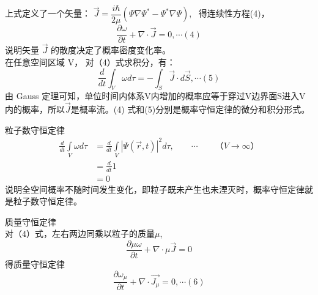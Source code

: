 \begin{frame} 
    上式定义了一个矢量： $\vec{J}=\dfrac{i \hbar}{2 \mu} \left(\Psi \nabla \Psi^{*}-\Psi^{*} \nabla \Psi\right) $,  得连续性方程(4)，\\
    \begin{equation*}
        \frac{\partial \omega}{\partial t}+ \nabla \cdot \vec{J}=0, \cdots (4)
    \end{equation*}    
    说明矢量 $\vec{J}$ 的散度决定了概率密度变化率。\\ \vspace{0.6em}
    在任意空间区域 V， 对（4）式求积分，有：
    \begin{equation*}
        \frac{d}{d t} \int_{V} \omega d \tau =-\int_{S} \vec{J} \cdot d \vec{S}, \cdots (5)
    \end{equation*}
    由 Gauss 定理可知，单位时间内体系V内增加的概率应等于穿过V边界面S进入V内的概率，所以$\vec{J}$是概率流。(4) 式和(5)分别是概率守恒定律的微分和积分形式。\\ \vspace{0.3em}
\end{frame}

\begin{frame}    
    \bullet 粒子数守恒定律\\ \vspace{0.3em}
    \begin{equation*}
        \begin{split}
        \frac{d}{d t} \int\limits_{V} \omega d \tau &= \frac{d}{d t} \int\limits_{V} |\Psi(\vec{r}, t)|^{2} d \tau ,\qquad \cdots \qquad （V \to \infty）  \\
        &=\frac{d}{d t} 1\\ 
        &=0
        \end{split}
    \end{equation*}
    说明全空间概率不随时间发生变化，即粒子既未产生也未湮灭时，概率守恒定律就是粒子数守恒定律。\\ \vspace{0.3em}
\end{frame}

\begin{frame} 
    \bullet 质量守恒定律\\ \vspace{0.3em}
    对（4）式，左右两边同乘以粒子的质量$\mu$, 
    \begin{equation*}
        \frac{\partial \mu\omega}{\partial t}+ \nabla \cdot \mu\vec{J}=0
    \end{equation*}  
    得质量守恒定律
    \begin{equation*}
        \frac{\partial \omega_\mu}{\partial t}+ \nabla \cdot \vec{J_\mu}=0, \cdots (6)
    \end{equation*} 
\end{frame}

